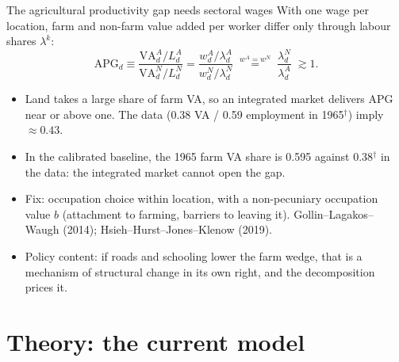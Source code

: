 \documentclass[10pt,aspectratio=169]{beamer}
\newcommand{\hl}[1]{\textcolor{mOrange}{#1}}
\newcommand{\unv}{$^{\dagger}$}
\begin{document}
\begin{frame}{The agricultural productivity gap needs sectoral wages}
  With one wage per location, farm and non-farm value added per worker differ only through
  labour shares $\lambda^k$:
  \begin{equation*}
    \mathrm{APG}_d\equiv\frac{\mathrm{VA}^A_d/L^A_d}{\mathrm{VA}^N_d/L^N_d}
    =\frac{w^A_d/\lambda^A_d}{w^N_d/\lambda^N_d}
    \;\overset{w^A=w^N}{=}\;\frac{\lambda^N_d}{\lambda^A_d}\;\gtrsim 1 .
  \end{equation*}
  \small
  \begin{itemize}
    \item Land takes a large share of farm VA, so an integrated market delivers APG near
          or above one. The data (0.38 VA / 0.59 employment in 1965\unv) imply
          $\approx 0.43$.
    \item In the calibrated baseline, the 1965 farm VA share is 0.595 against 0.38\unv{} in
          the data: the integrated market cannot open the gap.
    \item Fix: \hl{occupation choice} within location, with a non-pecuniary occupation
          value $b$ (attachment to farming, barriers to leaving it). Gollin--Lagakos--Waugh
          (2014); Hsieh--Hurst--Jones--Klenow (2019).
    \item Policy content: if roads and schooling lower the farm wedge, that is a
          mechanism of structural change in its own right, and the decomposition prices it.
  \end{itemize}
\end{frame}

\section{Theory: the current model}
\end{document}
